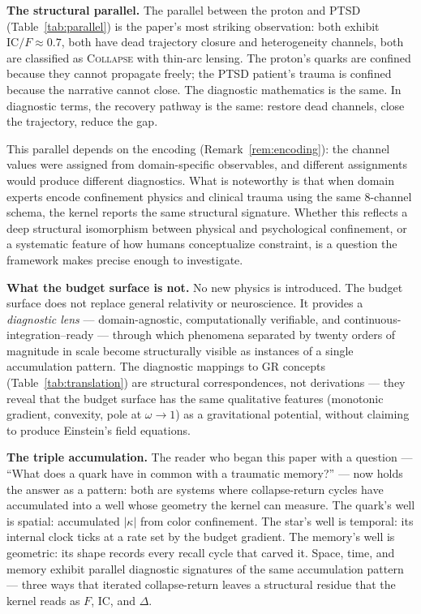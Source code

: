 \documentclass[
  aps,
  prd,
  twocolumn,
  superscriptaddress,
  nofootinbib,
  floatfix
]{revtex4-2}
\newcommand{\regime}[1]{\textsc{#1}}
\newcommand{\IC}{\mathrm{IC}}
\begin{document}
\textbf{The structural parallel.}
The parallel between the proton and PTSD
(Table~\ref{tab:parallel}) is the paper's most striking
observation: both exhibit $\IC/F \approx 0.7$, both have dead
trajectory closure and heterogeneity channels, both are
classified as \regime{Collapse} with thin-arc lensing.  The
proton's quarks are confined because they cannot propagate
freely; the PTSD patient's trauma is confined because the
narrative cannot close.  The diagnostic mathematics is the
same.  In diagnostic terms, the recovery pathway is the
same: restore dead channels, close the trajectory, reduce
the gap.

This parallel depends on the encoding
(Remark~\ref{rem:encoding}): the channel values were
assigned from domain-specific observables, and different
assignments would produce different diagnostics.  What is
noteworthy is that when domain experts encode confinement
physics and clinical trauma using the same 8-channel schema,
the kernel reports the same structural signature.  Whether
this reflects a deep structural isomorphism between physical
and psychological confinement, or a systematic feature of how
humans conceptualize constraint, is a question the framework
makes precise enough to investigate.

\textbf{What the budget surface is not.}
No new physics is introduced.  The budget surface does not
replace general relativity or neuroscience.  It provides a
\emph{diagnostic lens} --- domain-agnostic, computationally
verifiable, and continuous-integration--ready --- through which
phenomena separated by twenty orders of magnitude in scale
become structurally visible as instances of a single
accumulation pattern.  The diagnostic mappings to GR concepts
(Table~\ref{tab:translation}) are structural correspondences,
not derivations --- they reveal that the budget surface has
the same qualitative features (monotonic gradient,
convexity, pole at $\omega \to 1$) as a gravitational
potential, without claiming to produce Einstein's field
equations.

\textbf{The triple accumulation.}
The reader who began this paper with a question --- ``What
does a quark have in common with a traumatic memory?'' ---
now holds the answer as a pattern: both are systems where
collapse-return cycles have accumulated into a well whose
geometry the kernel can measure.  The quark's well is
spatial: accumulated $|\kappa|$ from color confinement.  The
star's well is temporal: its internal clock ticks at a rate
set by the budget gradient.  The memory's well is geometric:
its shape records every recall cycle that carved it.  Space,
time, and memory exhibit parallel diagnostic signatures of
the same accumulation pattern --- three ways that iterated
collapse-return leaves a structural residue that the kernel
reads as $F$, $\IC$, and $\Delta$.
\end{document}
